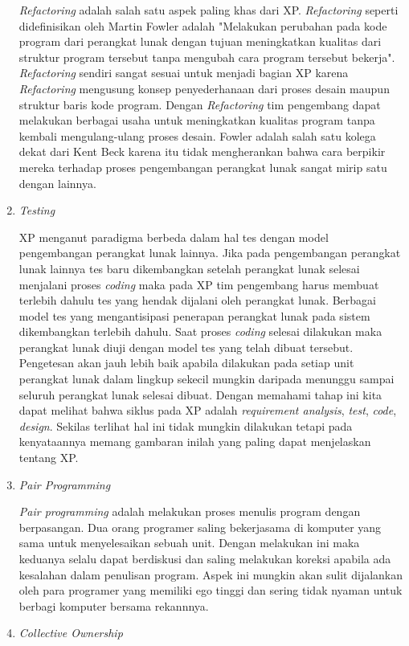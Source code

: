 \begin{enumerate}
      \emph{Refactoring} adalah salah satu aspek paling khas dari XP. \emph{Refactoring} seperti didefinisikan oleh Martin Fowler adalah "Melakukan perubahan pada kode program dari perangkat lunak dengan tujuan meningkatkan kualitas dari struktur program tersebut tanpa mengubah cara program tersebut bekerja". \emph{Refactoring} sendiri sangat sesuai untuk menjadi bagian XP karena \emph{Refactoring} mengusung konsep penyederhanaan dari proses desain maupun struktur baris kode program. Dengan \emph{Refactoring} tim pengembang dapat melakukan berbagai usaha untuk meningkatkan kualitas program tanpa kembali mengulang-ulang proses desain. Fowler adalah salah satu kolega dekat dari Kent Beck karena itu tidak mengherankan bahwa cara berpikir mereka terhadap proses pengembangan perangkat lunak sangat mirip satu dengan lainnya.
      \item \emph{Testing}
      
      XP menganut paradigma berbeda dalam hal tes dengan model pengembangan perangkat lunak lainnya. Jika pada pengembangan perangkat lunak lainnya tes baru dikembangkan setelah perangkat lunak selesai menjalani proses \emph{coding} maka pada XP tim pengembang harus membuat terlebih dahulu tes yang hendak dijalani oleh perangkat lunak. Berbagai model tes yang mengantisipasi penerapan perangkat lunak pada sistem dikembangkan terlebih dahulu. Saat proses \emph{coding} selesai dilakukan maka perangkat lunak diuji dengan model tes yang telah dibuat tersebut. Pengetesan akan jauh lebih baik apabila dilakukan pada setiap unit perangkat lunak dalam lingkup sekecil mungkin daripada menunggu sampai seluruh perangkat lunak selesai dibuat. Dengan memahami tahap ini kita dapat melihat bahwa siklus pada XP adalah \emph{requirement analysis}, \emph{test}, \emph{code}, \emph{design}. Sekilas terlihat hal ini tidak mungkin dilakukan tetapi pada kenyataannya memang gambaran inilah yang paling dapat menjelaskan tentang XP.
      \item \emph{Pair Programming}
      
      \emph{Pair programming} adalah melakukan proses menulis program dengan berpasangan. Dua orang programer saling bekerjasama di komputer yang sama untuk menyelesaikan sebuah unit. Dengan melakukan ini maka keduanya selalu dapat berdiskusi dan saling melakukan koreksi apabila ada kesalahan dalam penulisan program. Aspek ini mungkin akan sulit dijalankan oleh para programer yang memiliki ego tinggi dan sering tidak nyaman untuk berbagi komputer bersama rekannnya.
      \item \emph{Collective Ownership}
      

\end{enumerate}

